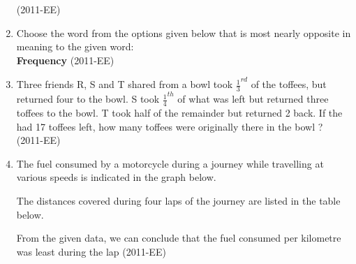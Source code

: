 \documentclass[journal]{IEEEtran}
\begin{document}
\begin{enumerate}
\hfill(2011-EE)
\begin{enumerate}
\end{enumerate}
\item Choose the word from the options given below that is most nearly opposite in meaning to the given word: \\
\textbf{Frequency} \hfill(2011-EE)
\begin{enumerate}
\end{enumerate}
\item Three friends R, S and T shared from a bowl took $\frac{1}{3}^{rd}$ of the toffees, but returned four to the bowl. S took $\frac{1}{4}^{th}$ of what was left but returned three toffees to the bowl. T took half of the remainder but returned 2 back. If the had 17 toffees left, how many toffees were originally there in the bowl ? \hfill(2011-EE)
	\begin{enumerate}
	\end{enumerate}
\item The fuel consumed by a motorcycle during a journey while travelling at various speeds is indicated in the graph below.
	\begin{figure}[H]
		\centering
		
	\end{figure}
	The distances covered during four laps of the journey are listed in the table below.
		
	From the given data, we can conclude that the fuel consumed per kilometre was least during the lap \hfill(2011-EE)

\end{enumerate}
\end{document}
